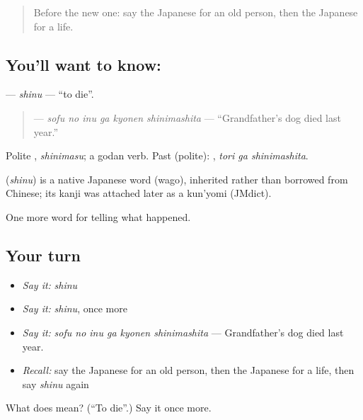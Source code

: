 \begin{quote}
Before the new one: say the Japanese for an old person, then the Japanese for a life.
\end{quote}

\subsection*{You'll want to know: }
\textbf{} — \emph{shinu} — \textquotedblleft{}to die\textquotedblright{}.

\begin{quote}
\textbf{   } — \emph{sofu no inu ga kyonen shinimashita} — \textquotedblleft{}Grandfather's dog died last year.\textquotedblright{}
\end{quote}

Polite \textbf{}, \emph{shinimasu}; a godan verb. Past (polite): \textbf{ }, \emph{tori ga shinimashita}.

\begin{cousinweb}
\textbf{} (\emph{shinu}) is a native Japanese word (wago), inherited rather than borrowed from Chinese; its kanji was attached later as a kun'yomi (JMdict).
\end{cousinweb}

\begin{grammarlens}[title={What you've built}]
One more word for telling what happened.
\end{grammarlens}

\subsection*{Your turn}
\begin{itemize}
\raggedright
  \item \emph{Say it:} \emph{shinu}
  \item \emph{Say it:} \emph{shinu}, once more
  \item \emph{Say it:} \emph{sofu no inu ga kyonen shinimashita} — Grandfather's dog died last year.
  \item \emph{Recall:} say the Japanese for an old person, then the Japanese for a life, then say \emph{shinu} again
\end{itemize}

\begin{tcolorbox}[breakable,colback=teal!4,colframe=teal!35!black,title={Before you move on}]
What does  mean? (\textquotedblleft{}To die\textquotedblright{}.) Say it once more.
\end{tcolorbox}
